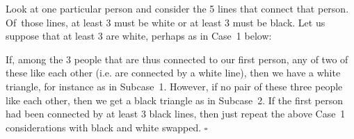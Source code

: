 \medskip


Look at one particular person and consider the 5 lines that connect that person.
Of~those lines, at least 3 must be white or at least 3 must be black.
Let us suppose that at least 3 are white,
perhaps as in Case~1 below:

\newcommand{\casesa}[4]{\begin{scope}[shift={(#1,#2)}]
    \foreach \rr/\na in {1/A,2/B,3/C,4/D,5/E,6/F}{\coordinate (\na) at (30+60*\rr:3);};
    \draw[gray ,very thick] (A) -- (C) (A) -- (D) (A) -- (E); #3
    \draw[white,     thick] (A) -- (C) (A) -- (D) (A) -- (E); #3
    \foreach \na in {A,C,D,E}{\fill[fill=white!100!gray,draw=darkgray] (\na) circle (3mm);};
    \node at (0,-4.5) {#4};
  \end{scope}}

\begin{center}
\end{center}
If, among the 3 people that are thus connected to our first person,
any of two of these like each other (i.e. are connected by a white line),
then we have a white triangle, for instance as in Subcase~1.
However, if no pair of these three people like each other,
then we get a black triangle as in Subcase~2.
If the first person had been connected by at least 3 black lines,
then just repeat the above Case~1 considerations with black and white swapped.  \hfill$\square$

